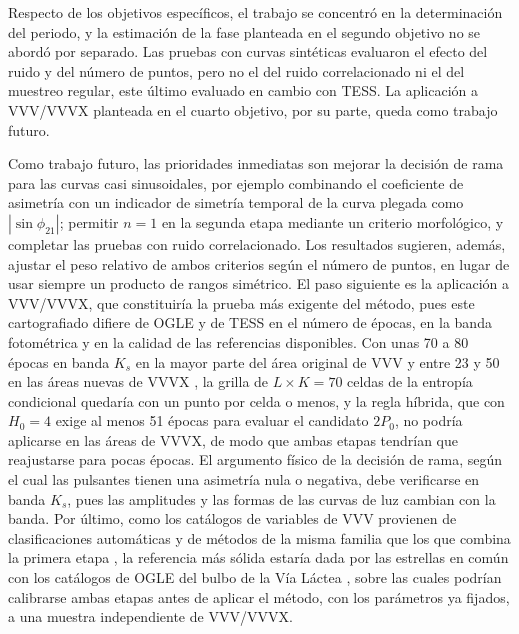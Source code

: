 \documentclass[12pt,letterpaper,oneside]{book}
\begin{document}
Respecto de los objetivos espec\'ificos, el trabajo se concentr\'o en la determinaci\'on del periodo, y la estimaci\'on de la fase planteada en el segundo objetivo no se abord\'o por separado. Las pruebas con curvas sint\'eticas evaluaron el efecto del ruido y del n\'umero de puntos, pero no el del ruido correlacionado ni el del muestreo regular, este \'ultimo evaluado en cambio con TESS. La aplicaci\'on a VVV/VVVX planteada en el cuarto objetivo, por su parte, queda como trabajo futuro.

Como trabajo futuro, las prioridades inmediatas son mejorar la decisi\'on de rama para las curvas casi sinusoidales, por ejemplo combinando el coeficiente de asimetr\'ia con un indicador de simetr\'ia temporal de la curva plegada como $|\sin\phi_{21}|$; permitir $n=1$ en la segunda etapa mediante un criterio morfol\'ogico, y completar las pruebas con ruido correlacionado. Los resultados sugieren, adem\'as, ajustar el peso relativo de ambos criterios seg\'un el n\'umero de puntos, en lugar de usar siempre un producto de rangos sim\'etrico. El paso siguiente es la aplicaci\'on a VVV/VVVX, que constituir\'ia la prueba m\'as exigente del m\'etodo, pues este cartografiado difiere de OGLE y de TESS en el n\'umero de \'epocas, en la banda fotom\'etrica y en la calidad de las referencias disponibles. Con unas 70 a 80 \'epocas en banda $K_s$ en la mayor parte del \'area original de VVV y entre 23 y 50 en las \'areas nuevas de VVVX \citep{Fajardo2026,saito_2024}, la grilla de $L\times K=70$ celdas de la entrop\'ia condicional quedar\'ia con un punto por celda o menos, y la regla h\'ibrida, que con $H_0=4$ exige al menos 51 \'epocas para evaluar el candidato $2P_0$, no podr\'ia aplicarse en las \'areas de VVVX, de modo que ambas etapas tendr\'ian que reajustarse para pocas \'epocas. El argumento f\'isico de la decisi\'on de rama, seg\'un el cual las pulsantes tienen una asimetr\'ia nula o negativa, debe verificarse en banda $K_s$, pues las amplitudes y las formas de las curvas de luz cambian con la banda. Por \'ultimo, como los cat\'alogos de variables de VVV provienen de clasificaciones autom\'aticas y de m\'etodos de la misma familia que los que combina la primera etapa \citep{saito_2024}, la referencia m\'as s\'olida estar\'ia dada por las estrellas en com\'un con los cat\'alogos de OGLE del bulbo de la V\'ia L\'actea \citep{Soszynski2011,Soszynski2014,Soszynski2016}, sobre las cuales podr\'ian calibrarse ambas etapas antes de aplicar el m\'etodo, con los par\'ametros ya fijados, a una muestra independiente de VVV/VVVX.
\end{document}
